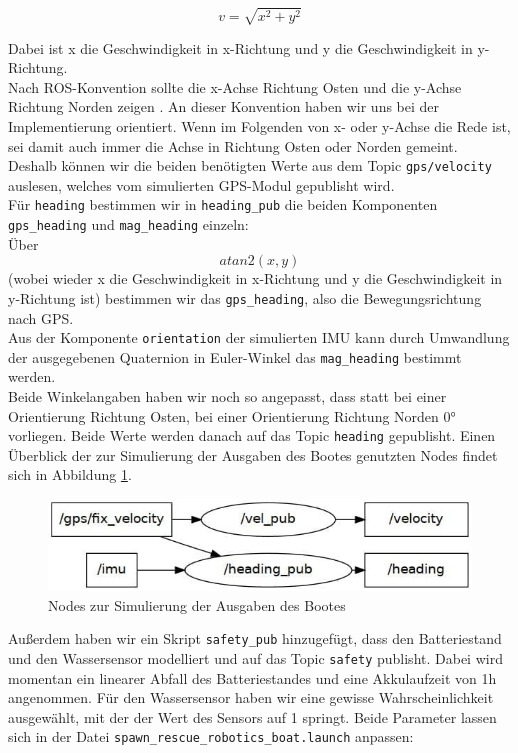 \documentclass[11pt]{article}
\begin{document}
\begin{equation}
v = \sqrt{x^2+y^2}
\end{equation}

Dabei ist x die Geschwindigkeit in x-Richtung und y die Geschwindigkeit in y-Richtung.\\
Nach ROS-Konvention sollte die x-Achse Richtung Osten und die y-Achse Richtung Norden zeigen \cite{REP105}. An dieser Konvention haben wir uns bei der Implementierung orientiert. Wenn im Folgenden von x- oder y-Achse die Rede ist, sei damit auch immer die Achse in Richtung Osten oder Norden gemeint.\\
Deshalb können wir die beiden benötigten Werte aus dem Topic \texttt{gps/velocity} auslesen, welches vom simulierten GPS-Modul gepublisht wird.\\
Für \texttt{heading} bestimmen wir in \texttt{heading\_pub} die beiden Komponenten \texttt{gps\_heading} und \texttt{mag\_heading} einzeln:\\
Über 
\begin{equation}
	atan2(x,y) 	
\end{equation}
(wobei wieder x die Geschwindigkeit in x-Richtung und y die Geschwindigkeit in y-Richtung ist) bestimmen wir das \texttt{gps\_heading}, also die Bewegungsrichtung nach GPS. \\
Aus der Komponente \texttt{orientation} der simulierten IMU kann durch Umwandlung der ausgegebenen Quaternion in Euler-Winkel das \texttt{mag\_heading} bestimmt werden.\\
Beide Winkelangaben haben wir noch so angepasst, dass statt bei einer Orientierung Richtung Osten, bei einer Orientierung Richtung Norden 0° vorliegen. Beide Werte werden danach auf das Topic \texttt{heading} gepublisht. Einen Überblick der zur Simulierung der Ausgaben des Bootes genutzten Nodes findet sich in Abbildung \ref{output-sim-nodes}.\\

\begin{figure}[h]
	\centering
	\includegraphics[width=0.7\linewidth]{simulation-nodes}
	\caption{Nodes zur Simulierung der Ausgaben des Bootes}
	\label{output-sim-nodes}
\end{figure}
Außerdem haben wir ein Skript \texttt{safety\_pub} hinzugefügt, dass den Batteriestand und den Wassersensor modelliert und auf das Topic \texttt{safety} publisht. Dabei wird momentan ein linearer Abfall des Batteriestandes und eine Akkulaufzeit von 1h angenommen. Für den Wassersensor haben wir eine gewisse Wahrscheinlichkeit ausgewählt, mit der der Wert des Sensors auf 1 springt. Beide Parameter lassen sich in der Datei \texttt{spawn\_rescue\_robotics\_boat.launch} anpassen:
\end{document}
